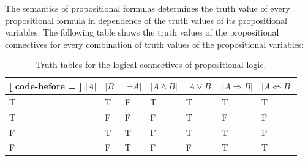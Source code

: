 The semantics of propositional formulas determines the truth value of every propositional formula in dependence of the truth values of its propositional variables. The following table shows the truth values of the propositional connectives for every combination of truth values of the propositional variables:

\begin{table}[ht]
    \centering
    \begin{NiceTabularX}{\textwidth}{X[c]|X[c]|X[2,c]|X[2,c]|X[2,c]|X[2,c]|X[2,c]}[
        code-before =  %
    ]
        $|A|$ & $|B|$ & $|\lnot A|$ & $|A\land B|$ & $|A\lor B|$ & $|A\Rightarrow B|$ & $|A\Leftrightarrow B|$ \\
        \hline
        T & T & F & T & T & T & T \\
        T & F & F & F & T & F & F \\
        F & T & T & F & T & T & F \\
        F & F & T & F & F & T & T \\
    \end{NiceTabularX}
    \caption{Truth tables for the logical connectives of propositional logic.}
    \label{table:logic:connectives}
\end{table}

